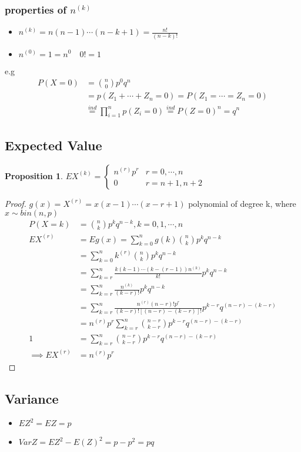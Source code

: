 \documentclass{article}
\theoremstyle{definition}
\theoremstyle{thrm}
\theoremstyle{lma}
\theoremstyle{ppst}
\newtheorem{ppst}{Proposition}[section]
\theoremstyle{crlr}
\begin{document}
\subsubsection{properties of $n^{(k)}$}
\begin{itemize}
	\item $n^{(k)} = n(n-1)\cdots(n-k+1) = \frac{n!}{(n-k)!}$
	\item $n^{(0)} = 1 = n^0 \quad 0!=1$
\end{itemize}
e.g 
\begin{align*}
	P(X=0) &= {n\choose 0}p^0q^n\\
	&=p(Z_1+\cdots+Z_n=0) = P(Z_1=\cdots=Z_n=0)\\
	&\stackrel{ind}{=} \prod _{i=1}^np(Z_i=0)\stackrel{ind}{=}P(Z=0)^n = q^n
\end{align*}
\subsection{Expected Value}	
\begin{ppst}
	$EX^{(k)} = \begin{cases}
		n^{(r)}p^r &r = 0,\cdots, n\\
		0 &r = n+1,n+2
	\end{cases}$
\end{ppst}
\begin{proof}
	$g(x) = X^{(r)} = x(x-1)\cdots(x-r+1)$ polynomial of degree k, where $x\sim bin(n,p)$\\
	\begin{align*}
		P(X=k)&= {n\choose k}p^kq^{n-k}, k =0,1,\cdots, n\\
		EX^{(r)} &= Eg(x) = \sum_{k=0}^ng(k){n\choose k}p^k q^{n-k}\\
		&= \sum_{k=0}^n k^{(r)}{n\choose k}p^k q^{n-k}\\
		&= \sum_{k=r}^n\frac{k(k-1)\cdots(k-(r-1))n^{(k)}}{k!}p^kq^{n-k}\\
		&= \sum_{k=r}^n \frac{n^{(k)}}{(k-r)!}p^kq^{n-k}\\
		&=\sum_{k=r}^n \frac{n^{(r)}(n-r)!p^r}{(k-r)![(n-r)-(k-r)]!}p^{k-r}q^{(n-r)-(k-r)}\\
		&= n^{(r)}p^r\sum_{k=r}^n {n-r \choose k-r} p^{k-r}q^{(n-r)-(k-r)}\\
		1&= \sum_{k=r}^n {n-r \choose k-r} p^{k-r}q^{(n-r)-(k-r)}\\
		\implies EX^{(r)} &= n^{(r)}p^r
	\end{align*}
\end{proof}
\subsection{Variance}
\begin{itemize}
	\item $EZ^2=EZ=p$
	\item $VarZ = EZ^2-E(Z)^2 = p-p^2 = pq$
\end{itemize}
\end{document}
